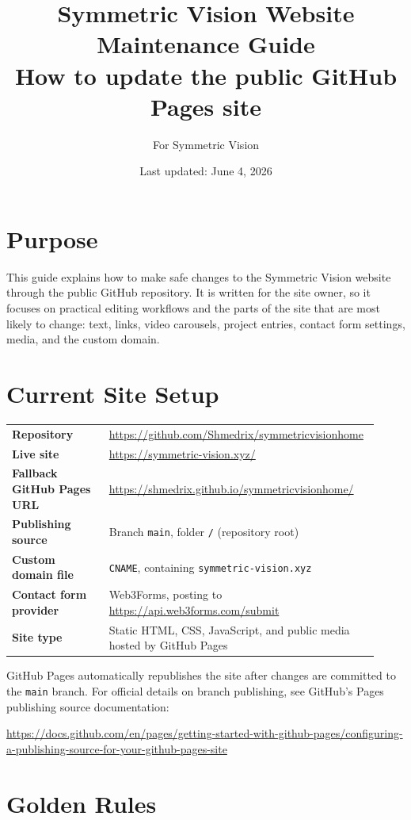 \documentclass[11pt]{article}
\title{\Huge Symmetric Vision Website Maintenance Guide\\[0.4em]
\large How to update the public GitHub Pages site}
\author{For Symmetric Vision}
\date{Last updated: June 4, 2026}
\begin{document}
\maketitle
\tableofcontents
\newpage

\section{Purpose}

This guide explains how to make safe changes to the Symmetric Vision website through the public GitHub repository. It is written for the site owner, so it focuses on practical editing workflows and the parts of the site that are most likely to change: text, links, video carousels, project entries, contact form settings, media, and the custom domain.

\section{Current Site Setup}

\begin{longtable}{>{\bfseries}p{0.26\linewidth}p{0.66\linewidth}}
Repository & \url{https://github.com/Shmedrix/symmetricvisionhome}\\
Live site & \url{https://symmetric-vision.xyz/}\\
Fallback GitHub Pages URL & \url{https://shmedrix.github.io/symmetricvisionhome/}\\
Publishing source & Branch \texttt{main}, folder \texttt{/} (repository root)\\
Custom domain file & \texttt{CNAME}, containing \texttt{symmetric-vision.xyz}\\
Contact form provider & Web3Forms, posting to \url{https://api.web3forms.com/submit}\\
Site type & Static HTML, CSS, JavaScript, and public media hosted by GitHub Pages\\
\end{longtable}

GitHub Pages automatically republishes the site after changes are committed to the \texttt{main} branch. For official details on branch publishing, see GitHub's Pages publishing source documentation:

\url{https://docs.github.com/en/pages/getting-started-with-github-pages/configuring-a-publishing-source-for-your-github-pages-site}

\section{Golden Rules}
\end{document}
